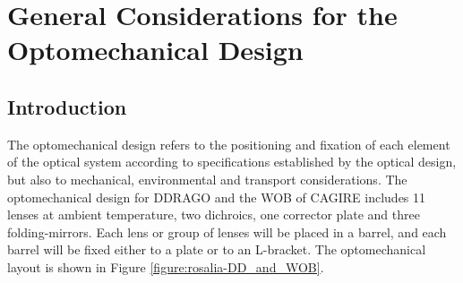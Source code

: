 \documentclass{report}
\begin{document}
%
%
%


\clearpage
\chapter{General Considerations for the Optomechanical Design}

%


\section{Introduction}

The optomechanical design refers to the positioning and fixation of each element of the optical system according to specifications established by the optical design, but also to mechanical, environmental and transport considerations.
The optomechanical design for DDRAGO and the WOB of CAGIRE includes 11 lenses at ambient temperature, two dichroics, one corrector plate and three folding-mirrors.
Each lens or group of lenses will be placed in a barrel, and each barrel will be fixed either to a plate or to an L-bracket. The optomechanical layout is shown in Figure \ref{figure:rosalia-DD_and_WOB}.
\end{document}

